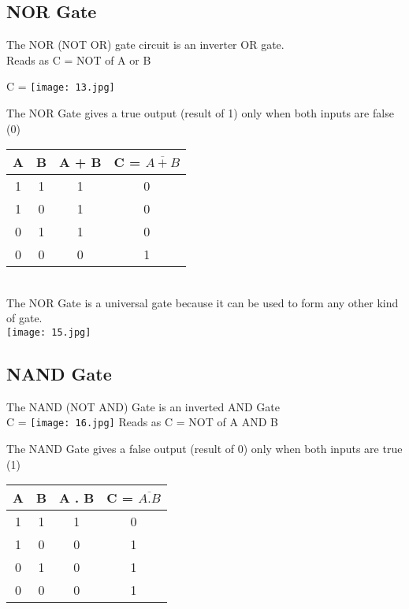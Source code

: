 \documentclass[10pt,a4paper,onecolumn]{article}
\begin{document}
\subsection{NOR Gate}
The NOR (NOT OR) gate circuit is an inverter OR gate. \\

\color{red}Reads as C = NOT of A or B \\ \color{black}

C = \texttt{[image: 13.jpg]}

The NOR Gate gives a true output (result of 1) only when both inputs are false (0) \\
\begin{table}[h!]
	\begin{center}
		\begin{tabular}{c|c|c|c}
			\textbf{A} & \textbf{B} &
			\textbf{A + B} & \textbf{C = $\overline{A + B}$}\\
			\hline
			1 & 1 & 1 & 0 \\
			\hline
			1 & 0 & 1 & 0 \\
			\hline
			0 & 1 & 1 & 0\\
			\hline
			0 & 0 & 0 & 1\\
			\hline
		\end{tabular}
	\end{center}
\end{table} \\


\color{red}The NOR Gate is a universal gate because it can be used to form any other kind of gate. \\ \color{black}
\texttt{[image: 15.jpg]}

\subsection{NAND Gate}
The NAND (NOT AND) Gate is an inverted AND Gate \\
C = \texttt{[image: 16.jpg]}
\color{red}Reads as C = NOT of A AND B \\ \color{black}

The NAND Gate gives a false output (result of 0) only when both inputs are true (1) \\

\begin{table}[h!]
	\begin{center}
		\begin{tabular}{c|c|c|c}
			\textbf{A} & \textbf{B} &
			\textbf{A . B} & \textbf{C = $\overline{A . B}$}\\
			\hline
			1 & 1 & 1 & 0\\
			\hline
			1 & 0 & 0 & 1\\
			\hline
			0 & 1 & 0 & 1\\
			\hline
			0 & 0 & 0 & 1\\
			\hline
		\end{tabular}
	\end{center}
\end{table} 
\end{document}
